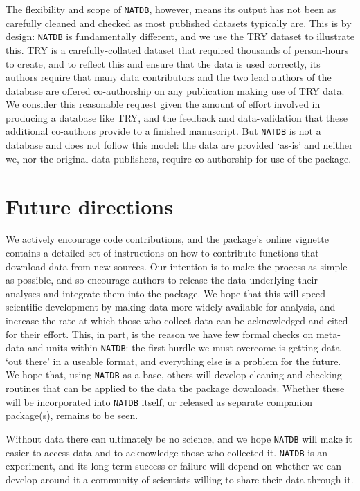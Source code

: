\documentclass[12pt]{report}
\newcommand{\natdb}{\texttt{NATDB}\xspace}
\begin{document}
The flexibility and scope of \natdb, however, means its output has not
been as carefully cleaned and checked as most published datasets
typically are. This is by design: \natdb is fundamentally different,
and we use the TRY dataset \autocite{Kattge2011} to illustrate
this. TRY is a carefully-collated dataset that required thousands of
person-hours to create, and to reflect this and ensure that the data
is used correctly, its authors require that many data contributors and
the two lead authors of the database are offered co-authorship on any
publication making use of TRY data. We consider this reasonable
request given the amount of effort involved in producing a database
like TRY, and the feedback and data-validation that these additional
co-authors provide to a finished manuscript. But \natdb is not a
database and does not follow this model: the data are provided `as-is'
and neither we, nor the original data publishers, require
co-authorship for use of the package.

\clearpage
\section{Future directions}
We actively encourage code contributions, and the package's online
vignette contains a detailed set of instructions on how to contribute
functions that download data from new sources. Our intention is to
make the process as simple as possible, and so encourage authors to
release the data underlying their analyses and integrate them into the
package. We hope that this will speed scientific development by making
data more widely available for analysis, and increase the rate at
which those who collect data can be acknowledged and cited for their
effort. This, in part, is the reason we have few formal checks on
meta-data and units within \natdb: the first hurdle we must overcome
is getting data `out there' in a useable format, and everything else
is a problem for the future. We hope that, using \natdb as a base,
others will develop cleaning and checking routines that can be applied
to the data the package downloads. Whether these will be incorporated
into \natdb itself, or released as separate companion package(s),
remains to be seen.

Without data there can ultimately be no science, and we hope \natdb
will make it easier to access data and to acknowledge those who
collected it. \natdb is an experiment, and its long-term success or
failure will depend on whether we can develop around it a community of
scientists willing to share their data through it.
\end{document}
